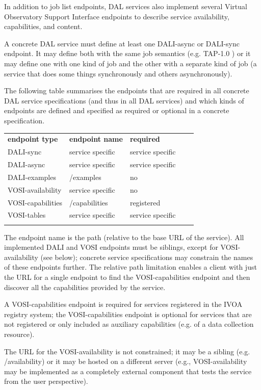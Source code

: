 \documentclass[11pt,letter]{ivoa}
\begin{document}
In addition to job list endpoints, DAL services also implement several Virtual
Observatory Support Interface \citep{2017ivoa.spec.0524G} endpoints to describe
service availability, capabilities, and content.

A concrete DAL service must define at least one DALI-async or DALI-sync
endpoint. It may define both with the same job semantics (e.g. TAP-1.0
\citep{2010ivoa.spec.0327D}) or it may define one with one kind of job and the other with a
separate kind of job (a service that does some things synchronously and others
asynchronously).

The following table summarises the endpoints that are required in all concrete
DAL service specifications (and thus in all DAL services) and which kinds of
endpoints are defined and specified as required or optional in a concrete
specification.


\begin{tabular}{l l l l l}
\sptablerule
\textbf{endpoint type} & \textbf{endpoint name} & \textbf{required} \\
\sptablerule
DALI-sync & service specific & service specific & \\
DALI-async & service specific & service specific & \\
DALI-examples & /examples & no & \\
VOSI-availability & service specific & no & \\
VOSI-capabilities & /capabilities & registered & \\
VOSI-tables & service specific & service specific & \\
\sptablerule
\label{tab:endpoints}
\end{tabular}

The endpoint name is the path (relative to the base URL of the service). All implemented
DALI and VOSI endpoints must be siblings, except for VOSI-availability (see below);
concrete service specifications may constrain the names of these endpoints further.
The relative path limitation enables a client with just the URL for a single endpoint to
find the VOSI-capabilities endpoint and then discover all the capabilities
provided by the service.

A VOSI-capabilities endpoint is required for services registered in the IVOA registry system;
the VOSI-capabilities endpoint is optional for services that are not registered
or only included as auxiliary capabilities (e.g. of a data collection resource).

The URL for the VOSI-availability is not constrained; it may be a sibling (e.g. /availability)
or it may be hosted on a different server (e.g., VOSI-availability may be implemented as a
completely external component that tests the service from the user perspective).
\end{document}

